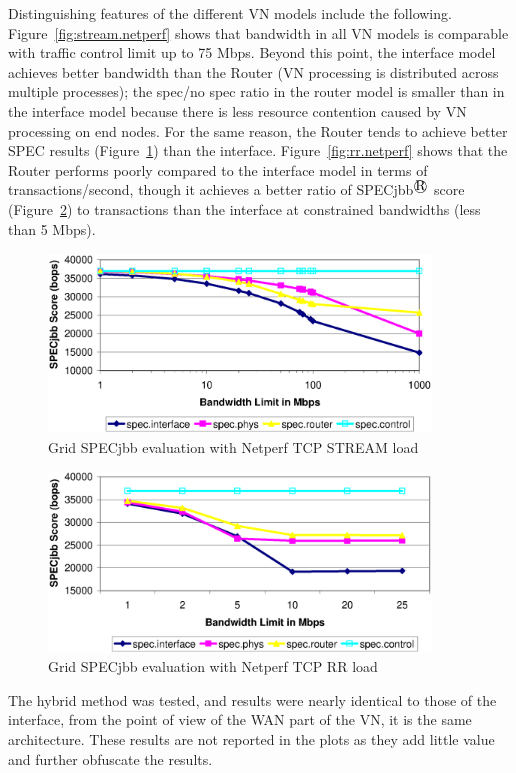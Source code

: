 Distinguishing features of the different VN models include the following.
Figure~\ref{fig:stream.netperf} shows that bandwidth in all VN models is
comparable with traffic control limit up to 75 Mbps. Beyond this point, the
interface model achieves better bandwidth than the Router (VN processing
is distributed across multiple processes); the spec/no spec ratio in the router
model is smaller than in the interface model because there is less resource
contention caused by VN processing on end nodes. For the same reason, the
Router tends to achieve better SPEC results (Figure~\ref{fig:stream.spec}) than
the interface.  Figure~\ref{fig:rr.netperf} shows that the Router performs
poorly compared to the interface model in terms of transactions/second, though
it achieves a better ratio of SPECjbb$^\registered$ score (Figure~\ref{fig:rr.spec}) to
transactions than the interface at constrained bandwidths (less than 5 Mbps).

\begin{figure}
\centering
\includegraphics[width=4in]{figs/stream.spec.jpg.eps}
\caption{Grid SPECjbb evaluation with Netperf TCP STREAM load}
\label{fig:stream.spec}
\end{figure}


\begin{figure}
\centering
\includegraphics[width=4in]{figs/rr.spec.jpg.eps}
\caption{Grid SPECjbb evaluation with Netperf TCP RR load}
\label{fig:rr.spec}
\end{figure}

The hybrid method was tested, and results were nearly identical to those of the
interface, from the point of view of the WAN part of the VN, it is the same
architecture.  These results are not reported in the plots as they add little
value and further obfuscate the results.

